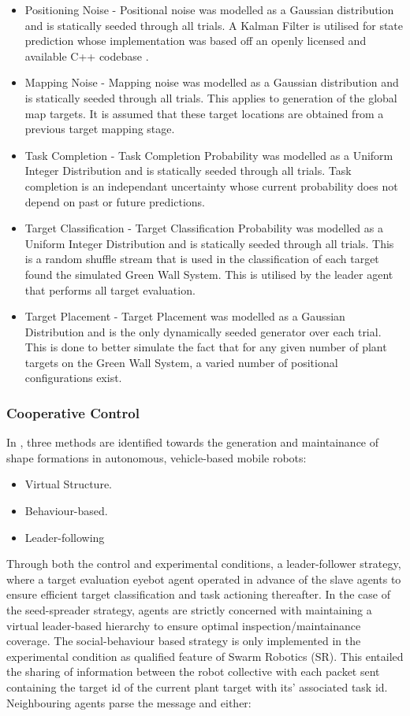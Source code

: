 \documentclass{report}
\begin{document}
\begin{itemize}
	\item Positioning Noise - Positional noise was modelled as a Gaussian distribution and is statically seeded through all trials. A Kalman Filter is utilised for state prediction whose implementation was based off an openly licensed and available C++ codebase \cite{KALMAN2015}.
	\item Mapping Noise - Mapping noise was modelled as a Gaussian distribution and is statically seeded through all trials. This applies to generation of the global map targets. It is assumed that these target locations are obtained from a previous target mapping stage.
	\item Task Completion - Task Completion Probability was modelled as a Uniform Integer Distribution and is statically seeded through all trials. Task completion is an independant uncertainty whose current probability does not depend on past or future predictions.
	\item Target Classification - Target Classification Probability was modelled as a Uniform Integer Distribution and is statically seeded through all trials. This is a random shuffle stream that is used in the classification of each target found the simulated Green Wall System. This is utilised by the leader agent that performs all target evaluation.
	\item Target Placement - Target Placement was modelled as a Gaussian Distribution and is the only dynamically seeded generator over each trial. This is done to better simulate the fact that for any given number of plant targets on the Green Wall System, a varied number of positional configurations exist.
\end{itemize}

\subsubsection{Cooperative Control}
In \cite{Macas2009}, three methods are identified towards the generation and maintainance of shape formations in autonomous, vehicle-based mobile robots:
\begin{itemize}
	\item Virtual Structure.
	\item Behaviour-based.
	\item Leader-following
\end{itemize}
Through both the control and experimental conditions, a leader-follower strategy, where a target evaluation eyebot agent operated in advance of the slave agents to ensure efficient target classification and task actioning thereafter. In the case of the seed-spreader strategy, agents are strictly concerned with maintaining a virtual leader-based hierarchy to ensure optimal inspection/maintainance coverage. The social-behaviour based strategy is only implemented in the experimental condition as qualified feature of Swarm Robotics (SR). This entailed the sharing of information between the robot collective with each packet sent containing the target id of the current plant target with its' associated task id. Neighbouring agents parse the message and either:
\end{document}
